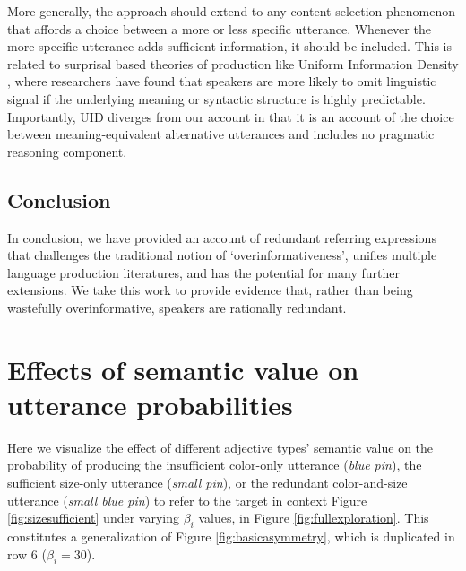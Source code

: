 \documentclass[11pt]{article}
\newcommand{\jd}[1]{\textcolor{Red}{[jd: #1]}}
\newcommand{\figref}[1]{Figure \ref{#1}}
\begin{document}
More generally, the approach should extend to any content selection phenomenon that affords a choice between a more or less specific utterance. Whenever the more specific utterance adds sufficient information, it should be included. This is related to surprisal based theories of production like Uniform Information Density \cite<UID,>{jaeger2006, levy2007, frank2008, jaeger2010}, where researchers have found that speakers are more likely to omit linguistic signal if the underlying meaning or syntactic structure is highly predictable. Importantly, UID diverges from our account in that it is an account of the choice between meaning-equivalent alternative utterances and includes no pragmatic reasoning component. 



\subsection{Conclusion}
\label{sec:conclusion}

In conclusion, we have provided an account of redundant referring expressions that challenges the traditional notion of `overinformativeness', unifies multiple language production literatures, and has the potential for many further extensions. We take this work to provide evidence that, rather than being wastefully overinformative, speakers are rationally redundant.


\appendix

\section{Effects of semantic value on utterance probabilities}
\label{app:modelexploration}

Here we visualize the effect of different adjective types' semantic value on the probability of producing the insufficient color-only utterance (\emph{blue pin}), the sufficient size-only utterance (\emph{small pin}), or the redundant color-and-size utterance  (\emph{small blue pin}) to refer to the target in context \figref{fig:sizesufficient} under varying $\beta_i$ values, in \figref{fig:fullexploration}. This constitutes a generalization of \figref{fig:basicasymmetry}, which is duplicated in row 6 ($\beta_i = 30$).
\end{document}
